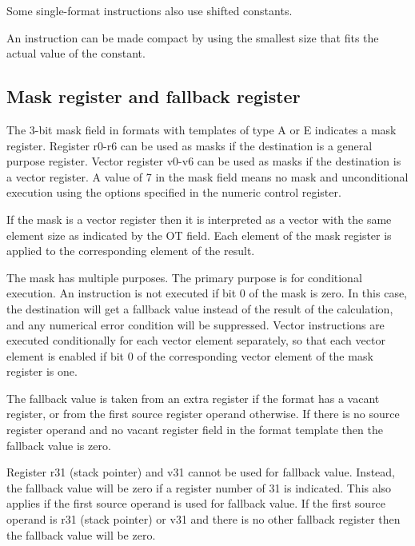 \documentclass[forwardcom.tex]{subfiles}
\begin{document}
Some single-format instructions also use shifted constants.
\vspace{2mm}

An instruction can be made compact by using the smallest size that fits the actual value of the constant.

\subsection{Mask register and fallback register}
The 3-bit mask field in formats with templates of type A or E indicates a mask register. Register r0-r6 can be used as masks if the destination is a general purpose register. Vector register v0-v6 can be used as masks if the destination is a vector register. A value of 7 in the mask field means no mask and unconditional execution using the options specified in the numeric control register.
\vspace{2mm}

If the mask is a vector register then it is interpreted as a vector with the same element size as indicated by the OT field. Each element of the mask register is applied to the corresponding element of the result.
\vspace{2mm}

The mask has multiple purposes. The primary purpose is for conditional execution. An instruction is not executed if bit 0 of the mask is zero. In this case, the destination will get a fallback value instead of the result of the calculation, and any numerical error condition will be suppressed. Vector instructions are executed conditionally for each vector element separately, so that each vector element is enabled if bit 0 of the corresponding vector element of the mask register is one.
\vspace{2mm}

The fallback value is taken from an extra register if the format has a vacant register, or from the first source register operand otherwise. If there is no source register operand and no vacant register field in the format template then the fallback value is zero.
\vspace{2mm}

Register r31 (stack pointer) and v31 cannot be used for fallback value. Instead, the fallback value will be zero if a register number of 31 is indicated. This also applies if the first source operand is used for fallback value. If the first source operand is r31 (stack pointer) or v31 and there is no other fallback register then the fallback value will be zero.
\vspace{2mm}
\end{document}
